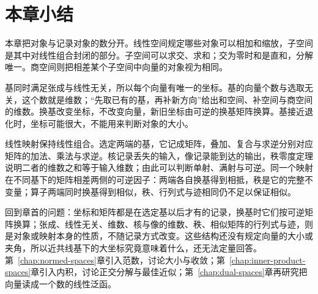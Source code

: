 \section{本章小结}
\label{sec:ls-representation-summary}

本章把对象与记录对象的数分开。线性空间规定哪些对象可以相加和缩放，子空间是其中对线性组合封闭的部分。子空间可以求交、求和；交为零时和是直和，分解唯一。商空间则把相差某个子空间中向量的对象视为相同。

基同时满足张成与线性无关，所以每个向量有唯一的坐标。基的向量个数与选取无关，这个数就是维数；“先取已有的基，再补新方向”给出和空间、补空间与商空间的维数。换基改变坐标，不改变向量，新旧坐标由可逆的换基矩阵换算。基接近退化时，坐标可能很大，不能用来判断对象的大小。

线性映射保持线性组合。选定两端的基，它记成矩阵，叠加、复合与求逆分别对应矩阵的加法、乘法与求逆。核记录丢失的输入，像记录能到达的输出，秩零度定理说明二者的维数之和等于输入维数；由此可以判断单射、满射与可逆。同一个映射在不同基下的矩阵相差两侧的可逆因子：两端各自换基得到相抵，秩是它的完整不变量；算子两端同时换基得到相似，秩、行列式与迹相同仍不足以保证相似。

回到章首的问题：坐标和矩阵都是在选定基以后才有的记录，换基时它们按可逆矩阵换算；张成、线性无关、维数、核与像的维数、秩、相似矩阵的行列式与迹，则是对象或映射本身的性质，不随记录方式改变。这些结构还没有规定向量的大小或夹角，所以近共线基下的大坐标究竟意味着什么，还无法定量回答。第~\ref{chap:normed-spaces}章引入范数，讨论大小与收敛；第~\ref{chap:inner-product-spaces}章引入内积，讨论正交分解与最佳近似；第~\ref{chap:dual-spaces}章再研究把向量读成一个数的线性泛函。

